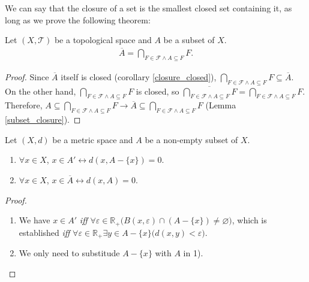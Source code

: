 \documentclass[openany]{book}
\begin{document}
We can say that the closure of a set is the smallest closed set containing it, as long as we prove the following theorem:

\begin{theorem}
Let $(X,\mathscr T)$ be a topological space and $A$ be a subset of $X$.
\begin{align*}
	\overline A = \bigcap_{F\in \mathscr F \wedge A\subseteq F} F.
\end{align*}
\end{theorem}
\begin{proof}
Since $\overline A$ itself is closed (corollary \ref{closure_closed}), $\bigcap_{F\in \mathscr F \wedge A\subseteq F} F \subseteq \overline A$. 
On the other hand, $\bigcap_{F\in \mathscr F \wedge A\subseteq F} F$ is closed, so $\overline{\bigcap_{F\in \mathscr F \wedge A\subseteq F} F} = \bigcap_{F\in \mathscr F \wedge A\subseteq F} F$.
Therefore, $A\subseteq \bigcap_{F\in \mathscr F \wedge A\subseteq F} F \to \overline A \subseteq \bigcap_{F\in \mathscr F \wedge A\subseteq F} F$ (Lemma \ref{subset_closure}). 
\end{proof}

\begin{theorem}
Let $(X,d)$ be a metric space and $A$ be a non-empty subset of $X$.
\begin{enumerate}[label=\arabic*)]
\item $\forall x\in X$, $x\in A' \leftrightarrow d(x,A-\{x\}) = 0$.
\item $\forall x\in X$, $x\in \overline A \leftrightarrow d(x,A)=0$.
\end{enumerate}
\end{theorem}
\begin{proof}
\begin{enumerate}[label=\arabic*)]
\item We have $x\in A' $ \emph{iff} $\forall \varepsilon\in \mathbb R_+\big(
	B (x,\varepsilon) \cap (A-\{x\}) \neq \varnothing\big)$, 
which is established \emph{iff} $\forall \varepsilon \in \mathbb R_+\exists y\in A-\{x\}\big(
	d(x,y) <\varepsilon\big)$.
\item We only need to substitude $A-\{x\}$ with $A$ in 1).
\end{enumerate}
\end{proof}
\end{document}
